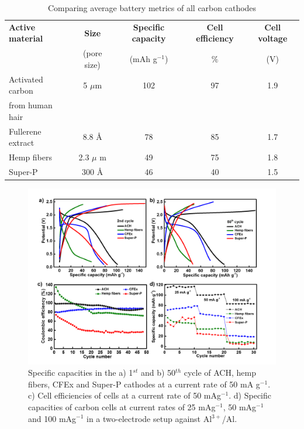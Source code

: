 \begin{table}[t]
\caption{Comparing average battery metrics of all carbon cathodes} \label{table1}
{\begin{tabular}{|lcccc|}
\hline
\textbf{Active material} & {\textbf{Size}} & \textbf{Specific capacity} & \textbf{Cell efficiency} & {\textbf{Cell voltage}}\\
 & (pore size) & (mAh g$^{-1}$) & $\%$ & (V)\\
\hline
Activated carbon & 5 ${\mu}$m & 102 & 97 & 1.9 \\
from human hair & & & & \\
Fullerene extract & 8.8 \AA & 78 & 85 & 1.7 \\
Hemp fibers & 2.3 $\mu$ m & 49 & 75 & 1.8 \\
Super-P & 300 \AA & 46 & 40 & 1.5 \\
\hline  %
\end{tabular}}
\end{table}

\begin{figure}[tbh!]
  \centering
  \includegraphics[width=\textwidth]{Figures/chap5fig/cdcall}
    \caption{Specific capacities in the a) 1$^{st}$ and b) 50$^{th}$ cycle of ACH, hemp fibers, CFEx and Super-P cathodes at a current rate of 50 mA g$^{-1}$. c) Cell efficiencies of cells at a current rate of 50 mAg$^{-1}$. d) Specific capacities of carbon cells at current rates of 25 mAg$^{-1}$, 50 mAg$^{-1}$ and 100 mAg$^{-1}$ in a two-electrode setup against Al$^{3+}$/Al. }
  \label{Figures/chap5fig:cdcall}
\end{figure}


